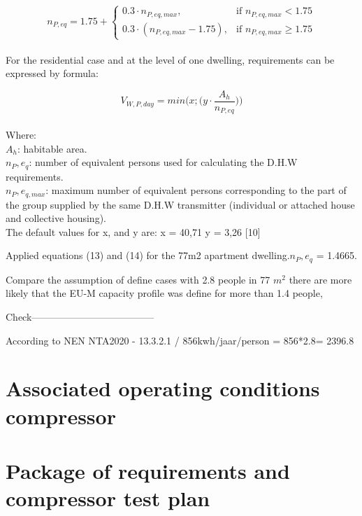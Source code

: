 \documentclass[a4paper,10pt]{article}
\begin{document}
\begin{equation}
    n_{P,eq}= 1.75 + \begin{cases}
			0.3\cdot n_{P,eq,max}, & \text{if $n_{P,eq,max} < 1.75$}\\
            0.3\cdot(n_{P,eq,max}- 1.75), & \text{if $n_{P,eq,max} \geq 1.75$}
		 \end{cases}
\end{equation}\\
For the residential case and at the level of one dwelling, requirements can be expressed by formula:


\begin{equation}
   V_{W,P,day} = min\Big(x;\Big(y\cdot \frac{A_h}{n_{P,eq}}\Big)\Big)
\end{equation}\\
Where:\\ 
$A_{h}$: habitable area.\\
$n_{P},e_{q}$: number of equivalent persons used for calculating the D.H.W requirements.\\
$n_{P},e_{q,max}$: maximum number of equivalent persons corresponding to the part of the group supplied by the same D.H.W transmitter (individual or attached house and collective housing).\\
The default values for x, and y are:
x = 40,71
y = 3,26 [10]

Applied equations (13) and (14) for the 77m2 apartment dwelling.$n_{P},e_{q}$ = 1.4665.

Compare the assumption of define cases with 2.8 people in 77 $m^2$ there are more likely that the EU-M capacity profile was define for more than 1.4 people,


Check--------------------------------------

According to NEN NTA2020 - 13.3.2.1 / 856kwh/jaar/person = 856*2.8= 2396.8

\section{Associated operating conditions compressor}




\section{ Package of requirements and compressor test plan}
\end{document}
